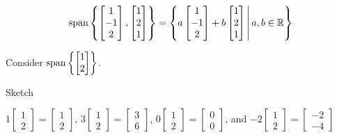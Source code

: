 \begin{applicationActivities}
\begin{definition}
  \[
    \operatorname{span}\left\{
      \begin{bmatrix} 1 \\ -1 \\ 2 \end{bmatrix},
      \begin{bmatrix} 1 \\ 2 \\ 1 \end{bmatrix}
    \right\} = \left\{
      a\begin{bmatrix} 1 \\ -1 \\ 2 \end{bmatrix}+
      b\begin{bmatrix} 1 \\ 2 \\ 1 \end{bmatrix}
    \,\middle|\,
      a,b\in\mathbb{R}
    \right\}
  \]
\end{definition}

\begin{activity}{10}
  Consider \(\operatorname{span}\left\{\begin{bmatrix}1\\2\end{bmatrix}\right\}\).
  \begin{subactivity}
    Sketch

    \(1\begin{bmatrix}1\\2\end{bmatrix}=\begin{bmatrix}1\\2\end{bmatrix}\),
    \hfill\(3\begin{bmatrix}1\\2\end{bmatrix}=\begin{bmatrix}3\\6\end{bmatrix}\),
    \hfill\(0\begin{bmatrix}1\\2\end{bmatrix}=\begin{bmatrix}0\\0\end{bmatrix}\),
    \hfill and \(-2\begin{bmatrix}1\\2\end{bmatrix}=\begin{bmatrix}-2\\-4\end{bmatrix}\) 


\end{subactivity}
\end{activity}
\end{applicationActivities}

